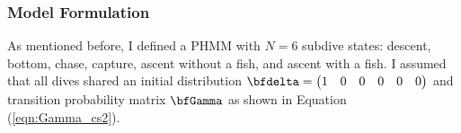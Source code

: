 
\subsubsection{Model Formulation}

As mentioned before, I defined a PHMM with $N = 6$ subdive states: descent, bottom, chase, capture, ascent without a fish, and ascent with a fish. I assumed that all dives shared an initial distribution $\bfdelta = \begin{pmatrix} 1 & 0 & 0 & 0 & 0 & 0 \end{pmatrix}$ and transition probability matrix $\bfGamma$ as shown in Equation (\ref{eqn:Gamma_cs2}).

